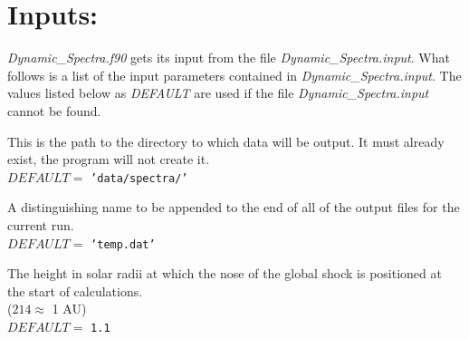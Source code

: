 \documentclass[12pt,a4paper]{article}
\begin{document}
\newpage

\section{Inputs:}\label{AppB:inputs}
  {\it Dynamic\_Spectra.f90} gets its input from the file 
  {\it Dynamic\_Spectra.input}. What follows is a list of the
  input parameters  contained in {\it Dynamic\_Spectra.input}. The values
  listed below as  {\it DEFAULT} are used if the file {\it
  Dynamic\_Spectra.input} cannot be found.


  \setlength{\temptextwidth}{\textwidth}  
  \addtolength{\temptextwidth}{-1.0\parindent}
    
    \parbox[t]{\temptextwidth}{This is the path to the directory to which
                               data will be output.  It must already
                               exist, \ie the program will not create it. \\
                               $DEFAULT=$  {\tt 'data/spectra/'}}

  \vspace{0.5cm}

  \setlength{\temptextwidth}{\textwidth}   
  \addtolength{\temptextwidth}{-1.0\parindent}
    
    \parbox[t]{\temptextwidth}{A distinguishing name to be appended to
                               the end of all of the output files for
                               the current run. \\ 
                               $DEFAULT=$ {\tt 'temp.dat'}}

  \vspace{0.5cm}

  \setlength{\temptextwidth}{\textwidth}  
  \addtolength{\temptextwidth}{-1.0\parindent} 
    
    \parbox[t]{\temptextwidth}{The height in solar radii at which the
                               nose of the  global shock is positioned at
                               the start of  calculations. \\ 
                               ($214\approx$ 1 AU)         \\
                               $DEFAULT=$ {\tt 1.1}}
 
  \vspace{0.5cm}

  \setlength{\temptextwidth}{\textwidth}   
  \addtolength{\temptextwidth}{-1.0\parindent} 
    
\end{document}
